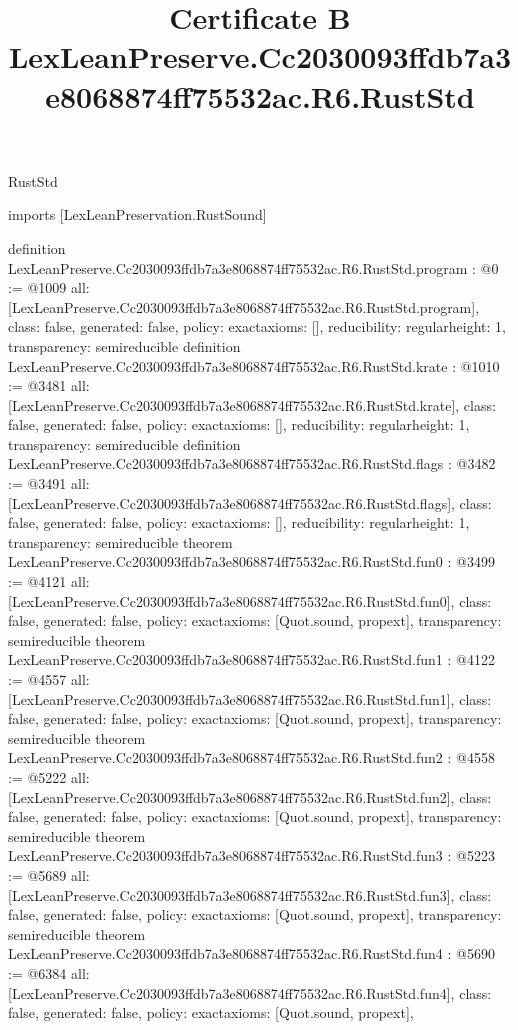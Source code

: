 \begin{lexlean}{RustStd}
\title{Certificate B LexLeanPreserve.Cc2030093ffdb7a3e8068874ff75532ac.R6.RustStd}
\begin{coremodule}
imports [LexLeanPreservation.RustSound]

definition LexLeanPreserve.Cc2030093ffdb7a3e8068874ff75532ac.R6.RustStd.program : @0 := @1009 {
  all: [LexLeanPreserve.Cc2030093ffdb7a3e8068874ff75532ac.R6.RustStd.program],
  class: false,
  generated: false,
  policy: exact{axioms: []},
  reducibility: regular{height: 1},
  transparency: semireducible
}
definition LexLeanPreserve.Cc2030093ffdb7a3e8068874ff75532ac.R6.RustStd.krate : @1010 := @3481 {
  all: [LexLeanPreserve.Cc2030093ffdb7a3e8068874ff75532ac.R6.RustStd.krate],
  class: false,
  generated: false,
  policy: exact{axioms: []},
  reducibility: regular{height: 1},
  transparency: semireducible
}
definition LexLeanPreserve.Cc2030093ffdb7a3e8068874ff75532ac.R6.RustStd.flags : @3482 := @3491 {
  all: [LexLeanPreserve.Cc2030093ffdb7a3e8068874ff75532ac.R6.RustStd.flags],
  class: false,
  generated: false,
  policy: exact{axioms: []},
  reducibility: regular{height: 1},
  transparency: semireducible
}
theorem LexLeanPreserve.Cc2030093ffdb7a3e8068874ff75532ac.R6.RustStd.fun0 : @3499 := @4121 {
  all: [LexLeanPreserve.Cc2030093ffdb7a3e8068874ff75532ac.R6.RustStd.fun0],
  class: false,
  generated: false,
  policy: exact{axioms: [Quot.sound, propext]},
  transparency: semireducible
}
theorem LexLeanPreserve.Cc2030093ffdb7a3e8068874ff75532ac.R6.RustStd.fun1 : @4122 := @4557 {
  all: [LexLeanPreserve.Cc2030093ffdb7a3e8068874ff75532ac.R6.RustStd.fun1],
  class: false,
  generated: false,
  policy: exact{axioms: [Quot.sound, propext]},
  transparency: semireducible
}
theorem LexLeanPreserve.Cc2030093ffdb7a3e8068874ff75532ac.R6.RustStd.fun2 : @4558 := @5222 {
  all: [LexLeanPreserve.Cc2030093ffdb7a3e8068874ff75532ac.R6.RustStd.fun2],
  class: false,
  generated: false,
  policy: exact{axioms: [Quot.sound, propext]},
  transparency: semireducible
}
theorem LexLeanPreserve.Cc2030093ffdb7a3e8068874ff75532ac.R6.RustStd.fun3 : @5223 := @5689 {
  all: [LexLeanPreserve.Cc2030093ffdb7a3e8068874ff75532ac.R6.RustStd.fun3],
  class: false,
  generated: false,
  policy: exact{axioms: [Quot.sound, propext]},
  transparency: semireducible
}
theorem LexLeanPreserve.Cc2030093ffdb7a3e8068874ff75532ac.R6.RustStd.fun4 : @5690 := @6384 {
  all: [LexLeanPreserve.Cc2030093ffdb7a3e8068874ff75532ac.R6.RustStd.fun4],
  class: false,
  generated: false,
  policy: exact{axioms: [Quot.sound, propext]},
}
\end{coremodule}
\end{lexlean}
